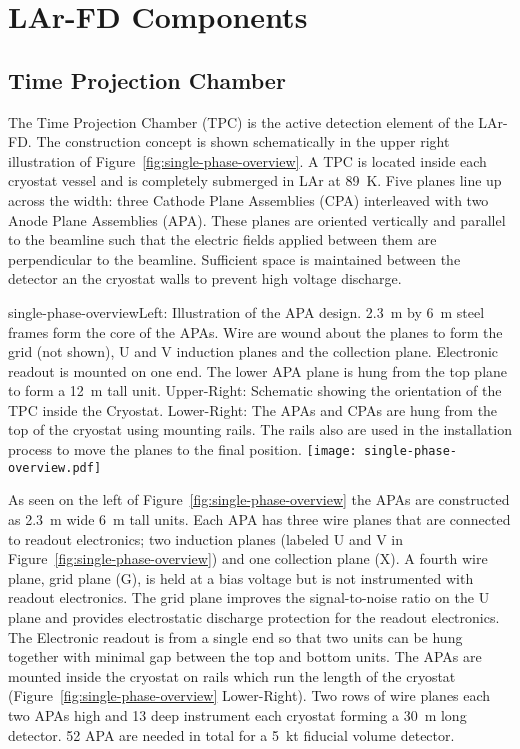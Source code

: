 \section{LAr-FD Components}
\label{sec:larfd-components}

\subsection{Time Projection Chamber}

The Time Projection Chamber (TPC) is the active detection element of the LAr-FD. The construction concept is  shown schematically in the upper right illustration of Figure~\ref{fig:single-phase-overview}.  A TPC is located inside each cryostat vessel and is completely submerged in LAr at 89~K. Five planes line up across the width: three Cathode Plane Assemblies (CPA)   interleaved with two Anode Plane Assemblies (APA). These planes are oriented vertically and  parallel to the beamline such that the electric fields applied between them are perpendicular to the beamline. Sufficient space is maintained between the detector an the cryostat walls to prevent high voltage discharge. 


\begin{cdrfigure}{single-phase-overview}{Left: Illustration of the APA design. 2.3~m by 6~m steel frames form the core of the APAs. Wire are wound about the planes to form the grid (not shown), U and V induction planes and the collection plane. Electronic readout is mounted on one end. The lower APA plane is hung from the top plane to form a 12~m tall unit. Upper-Right: Schematic showing the orientation of the TPC inside the Cryostat. Lower-Right: The APAs and CPAs are hung from the top of the cryostat using mounting rails. The rails also are used in the installation process to move the planes to the final position. }
 \texttt{[image: single-phase-overview.pdf]}
\end{cdrfigure}
 
As seen on the left of Figure~\ref{fig:single-phase-overview} the APAs are constructed as 2.3~m wide 6~m tall units. Each APA has three wire planes that are connected to readout electronics; two induction planes (labeled U and V in Figure~\ref{fig:single-phase-overview}) and one collection plane (X). A fourth wire plane, grid plane (G), is held at a bias voltage but is not instrumented with readout electronics. The grid plane improves the signal-to-noise ratio on the U plane and provides electrostatic discharge protection for the readout electronics. The Electronic readout is from a single end so that two units can be hung together with minimal gap between the top and bottom units. The APAs are mounted inside the cryostat on rails which run the length of the cryostat (Figure~\ref{fig:single-phase-overview} Lower-Right). Two rows of wire planes each two APAs high and 13 deep instrument each cryostat forming a 30~m long detector. 52 APA are needed in total for a 5~kt fiducial volume detector. 

